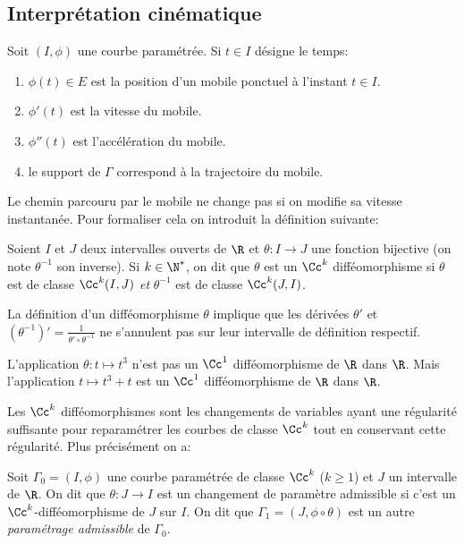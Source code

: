 \sld{\vfill\pagebreak[5]}%


\subsection{Interprétation cinématique} 

Soit $(I,\phi)$ une courbe paramétrée. Si $t\in I$ désigne le temps:
\begin{enumerate}
	\item $\phi(t) \in E$ est la position d'un mobile ponctuel à l'instant $t\in I$. 
	\item  $\phi'(t)$ est la vitesse du mobile.
	\item $\phi''(t)$ est l'accélération du mobile. 
	\item le support de $\Gamma$ correspond à la trajectoire du mobile.
\end{enumerate}

\pl{\rep{5cm}}


Le chemin parcouru par le mobile ne change pas si on modifie sa vitesse instantanée.  Pour formaliser cela on introduit la définition suivante:

\begin{definition}
	Soient $I$ et $J$ deux intervalles ouverts de $\R$ et $\theta: I \to J$ une fonction bijective (on note $\theta^{-1}$ son inverse). Si $k\in\N^*$, on dit que $\theta$  est un $\Cc^k$ difféomorphisme si $\theta$ est  de classe $\Cc^k(I,J)$ \emph{et} $\theta^{-1}$ est de classe $\Cc^k(J,I)$.
\end{definition}
\begin{remark}
    La définition d'un difféomorphisme $\theta$ implique que les dérivées $\theta'$ et $(\theta^{-1})' = \frac{1}{\theta' \circ \theta^{-1}}$ ne s'annulent pas sur leur intervalle de définition respectif. 
\end{remark}

\begin{exemple}
	L'application $\theta: t \mapsto t^3$ n'est pas un $\Cc^1$ difféomorphisme de $\R$ dans $\R$. Mais l'application $t\mapsto t^3 +t$ est un $\Cc^1$ difféomorphisme de $\R$ dans $\R$.
	\pl{\rep{7cm}}
\end{exemple}

\sld{\vfill\pagebreak[5]}%


Les $\Cc^k$ difféomorphismes sont les changements de variables ayant une régularité suffisante pour reparamétrer les courbes de classe $\Cc^k$ tout en conservant cette régularité. Plus précisément on a:
\begin{definition}
	Soit $\Gamma_0 = (I,\phi)$ une courbe paramétrée de classe $\Cc^k$ ($k\geq 1$) et $J$ un intervalle de $\R$. On dit que $\theta: J \to I$ est un changement de paramètre admissible si c'est un $ \Cc^k$-difféomorphisme de $J$ sur $I$. On dit que $\Gamma_1 = (J,\phi \circ \theta)$ est un autre \emph{paramétrage admissible} de $\Gamma_0$.
\end{definition}
	\pl{\rep{4cm}}

